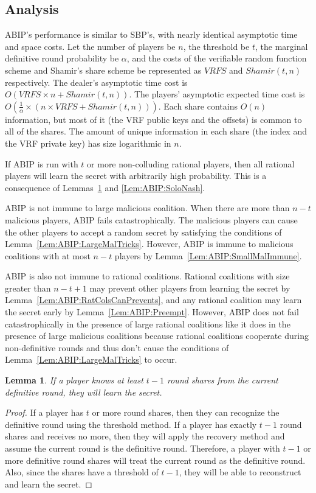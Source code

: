 \documentclass[12pt]{dalcsthesis}
\newtheorem{lemma}{Lemma}
\begin{document}
\subsection{Analysis}

ABIP's performance is similar to SBP's, with nearly identical asymptotic time and space costs. Let the number of players be $n$, the threshold be $t$, the marginal definitive round probability be $\alpha$, and the costs of the verifiable random function scheme and Shamir's share scheme be represented as $VRFS$ and $Shamir(t, n)$ respectively. The dealer's asymptotic time cost is $O(VRFS \times n + Shamir(t, n))$. The players' asymptotic expected time cost is $O(\frac{1}{\alpha} \times (n \times VRFS + Shamir(t, n)))$. Each share contains $O(n)$ information, but most of it (the VRF public keys and the offsets) is common to all of the shares. The amount of unique information in each share (the index and the VRF private key) has size logarithmic in $n$.

If ABIP is run with $t$ or more non-colluding rational players, then all rational players will learn the secret with arbitrarily high probability. This is a consequence of Lemmas~\ref{Lem:ABIP:t-1Def_Sufficient} and \ref{Lem:ABIP:SoloNash}.  

ABIP is not immune to large malicious coalition. When there are more than $n-t$ malicious players, ABIP fails catastrophically. The malicious players can cause the other players to accept a random secret by satisfying the conditions of Lemma~\ref{Lem:ABIP:LargeMalTricks}. However, ABIP is immune to malicious coalitions with at most $n-t$ players by Lemma~\ref{Lem:ABIP:SmallMalImmune}.

ABIP is also not immune to rational coalitions. Rational coalitions with size greater than $n-t+1$ may prevent other players from learning the secret by Lemma~\ref{Lem:ABIP:RatColsCanPrevents}, and any rational coalition may learn the secret early by Lemma~\ref{Lem:ABIP:Preempt}. However, ABIP does not fail catastrophically in the presence of large rational coalitions like it does in the presence of large malicious coalitions because rational coalitions cooperate during non-definitive rounds and thus don't cause the conditions of Lemma~\ref{Lem:ABIP:LargeMalTricks} to occur.

\begin{lemma}\label{Lem:ABIP:t-1Def_Sufficient}If a player knows at least $t-1$ round shares from the current definitive round, they will learn the secret.\end{lemma}
\begin{proof}
If a player has $t$ or more round shares, then they can recognize the definitive round using the threshold method. If a player has exactly $t-1$ round shares and receives no more, then they will apply the recovery method and assume the current round is the definitive round. Therefore, a player with $t-1$ or more definitive round shares will treat the current round as the definitive round. Also, since the shares have a threshold of $t-1$, they will be able to reconstruct and learn the secret.
\end{proof}
\end{document}
